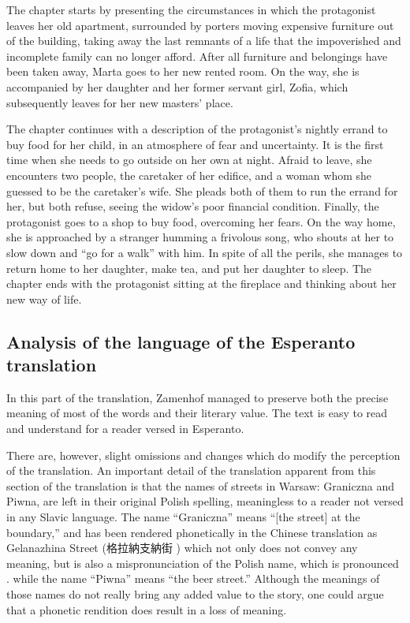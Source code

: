 The chapter starts by presenting the circumstances in which the protagonist leaves her old apartment, surrounded by porters moving expensive furniture out of the building, taking away the last remnants of a life that the impoverished and incomplete family can no longer afford.
After all furniture and belongings have been taken away, Marta goes to her new rented room.
On the way, she is accompanied by her daughter and her former servant girl, Zofia, which subsequently leaves for her new masters' place.

The chapter continues with a description of the protagonist's nightly errand to buy food for her child, in an atmosphere of fear and uncertainty.
It is the first time when she needs to go outside on her own at night.
Afraid to leave, she encounters two people, the caretaker of her edifice, and a woman whom she guessed to be the caretaker's wife.
She pleads both of them to run the errand for her, but both refuse, seeing the widow's poor financial condition.
Finally, the protagonist goes to a shop to buy food, overcoming her fears.
On the way home, she is approached by a stranger humming a frivolous song, who shouts at her to slow down and ``go for a walk'' with him.
In spite of all the perils, she manages to return home to her daughter, make tea, and put her daughter to sleep.
The chapter ends with the protagonist sitting at the fireplace and thinking about her new way of life.

\subsection{Analysis of the language of the Esperanto translation}

In this part of the translation, Zamenhof managed to preserve both the precise meaning of most of the words and their literary value. The text is easy to read and understand for a reader versed in Esperanto.

There are, however, slight omissions and changes which do modify the perception of the translation.
An important detail of the translation apparent from this section of the translation is that the names of streets in Warsaw: Graniczna and Piwna, are left in their original Polish spelling, meaningless to a reader not versed in any Slavic language. %
The name ``Graniczna'' means ``[the street] at the boundary,'' and has been rendered phonetically in the Chinese translation as Gelanazhina Street (格拉納支納街 ) which not only does not convey any meaning, but is also a mispronunciation of the Polish name, which is pronounced \ipa{[ɡrãˈɲiʧ̑na]}.
while the name ``Piwna'' means ``the beer street.''
Although the meanings of those names do not really bring any added value to the story, one could argue that a phonetic rendition does result in a loss of meaning.

